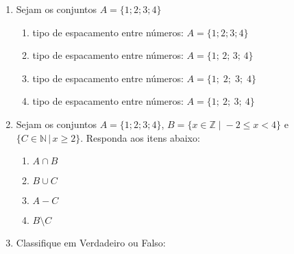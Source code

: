 \documentclass[a4paper, 12pt]{article}
\begin{document}
\begin{enumerate}
    \item Sejam os conjuntos $A = \{1; 2; 3; 4\}$ %
    
    \begin{enumerate}
        \item tipo de espacamento entre números: $A =\{1; 2; 3; 4 \}$ %
        \item tipo de espacamento entre números: $A =\{1;\, 2;\, 3;\, 4 \}$ %
        \item tipo de espacamento entre números: $A =\{1;\; 2;\; 3;\; 4 \}$ %
        \item tipo de espacamento entre números: $A =\{1;\ 2;\ 3;\ 4 \}$ %
    \end{enumerate}
     
     \item Sejam os conjuntos $A = \{1; 2; 3; 4\}$, 
     $B = \{x \in \mathbb{Z} \;|\; -2 \leq x < 4 \}$ %
     e $\{C \in \mathbb{N} \,|\, x \geq 2 \}$. %
     Responda aos itens abaixo:
     
     \begin{enumerate}
         \item $A \cap B$ %
         \item $B \cup C$ %
         \item $A - C$ %
         \item $B \setminus C$ %
     \end{enumerate}
     
     \item Classifique em Verdadeiro ou Falso:
     

\end{enumerate}
\end{document}
